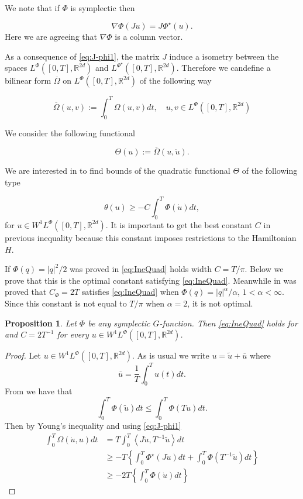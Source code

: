 \documentclass[twoside]{article}
\newtheorem{prop}[thm]{Proposition}
\theoremstyle{remark}
\newcommand{\rr}{\mathbb{R}}
\renewcommand{\leq}{\leqslant}
\renewcommand{\geq}{\geqslant}
\newcommand{\Phie}{\Phi^{\star}}
\begin{document}
We note that if $\Phi$ is symplectic then

\begin{equation}\label{eq:J-phi2}
 \nabla\Phi(Ju)= J\Phie(u).
\end{equation}
Here we are agreeing that $\nabla\Phi$ is a column vector.

As a consequence of \eqref{eq:J-phi1}, the matrix $J$ induce a isometry  between the spaces $L^{\Phi}([0,T],\rr^{2d})$ and $L^{\Phie}([0,T],\rr^{2d})$.  Therefore we candefine  a bilinear form $\overline{\Omega}$  on $L^{\Phi}([0,T],\rr^{2d})$ of the following way

\[\overline{\Omega}(u,v):=\int_0^T\Omega(u, v) dt,\quad u,v\in L^{\Phi}([0,T],\rr^{2d})\]

We consider the following functional

\[\Theta(u):=\overline{\Omega}(u,\dot{u}).\]

We are interested in to find bounds of the quadratic functional $\Theta$ of the following type

\begin{equation}\label{eq:IneQuad}
 \theta(u)\geq -C\int_0^T\Phi\left(\dot{u}\right)dt,
\end{equation}
for $u\in W^1L^{\Phi}([0,T],\rr^{2d})$. It is important to get the best constant $C$ in previous inequality because this constant imposes  restrictions to the Hamiltonian $H$. 

If $\Phi(q)=|q|^2/2$ was proved in \cite[Prop. 3.2]{mawhin2010critical} \eqref{eq:IneQuad} holds width $C=T/\pi$.  Below we prove that this is the optimal constant satisfying \eqref{eq:IneQuad}.   Meanwhile in \cite[Lem. 3.3]{Tian2007192} 
was proved that $C_{\Phi}=2T$ satisfies \eqref{eq:IneQuad} when $\Phi(q)=|q|^{\alpha}/\alpha$, $1<\alpha<\infty$. Since this constant is not equal to $T/\pi$ when $\alpha=2$, it is not optimal.

\begin{prop}
 Let $\Phi$ be any symplectic $G$-function. Then  \eqref{eq:IneQuad} holds for  and $C=2T^{-1}$ for every  $u\in W^1L^{\Phi}([0,T],\rr^{2d})$.
\end{prop}

 \begin{proof} Let  $u\in W^1L^{\Phi}([0,T],\rr^{2d})$. As is usual we write $u=\tilde{u}+\overline{u}$ where
 \[\overline{u}=\frac{1}{T}\int_0^Tu(t)dt.\]
 From \cite[Lem. 2.4]{MA2017} we have that
 \[\int_0^T\Phi(\tilde{u})dt\leq\int_0^T\Phi(T\dot{u})dt.\]
 Then by Young's inequality and using \eqref{eq:J-phi1}
 \[
 \begin{split}
  \int_0^T\Omega\left(\dot{u},u\right)dt &=T\int_0^T\left\langle J\dot{u},T^{-1}\tilde{u}\right\rangle dt\\
  &\geq -T\left\{ \int_0^T\Phie(J\dot{u})dt + \int_0^T\Phi(T^{-1}\tilde{u})dt \right\}\\
  &\geq -2T\left\{ \int_0^T\Phi(\dot{u})dt \right\}
  \end{split}
 \]
 \end{proof}
\end{document}
